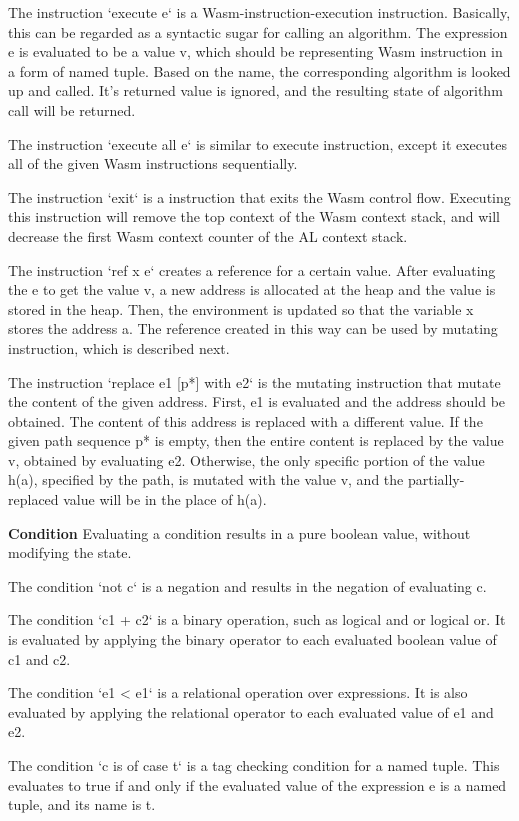 The instruction `execute e` is a Wasm-instruction-execution instruction. Basically, this can be
regarded as a syntactic sugar for calling an algorithm. The expression e is evaluated to be
a value v, which should be representing Wasm instruction in a form of named tuple.
Based on the name, the corresponding algorithm is looked up and called. It's returned value is
ignored, and the resulting state of algorithm call will be returned.

The instruction `execute all e` is similar to execute instruction,
except it executes all of the given Wasm instructions sequentially.

The instruction `exit` is a instruction that exits the Wasm control flow.
Executing this instruction will remove the top context of the Wasm context stack,
and will decrease the first Wasm context counter of the AL context stack.

The instruction `ref x e` creates a reference for a certain value.
After evaluating the e to get the value v, a new address is allocated at the heap and
the value is stored in the heap. Then, the environment is updated so that the
variable x stores the address a. The reference created in this way can be
used by mutating instruction, which is described next.

The instruction `replace e1 [p*] with e2` is the mutating instruction that
mutate the content of the given address. First, e1 is evaluated and the
address should be obtained. The content of this address is replaced with
a different value. If the given path sequence p* is empty, then the entire content
is replaced by the value v, obtained by evaluating e2. Otherwise, the only
specific portion of the value h(a), specified by the path, is mutated with the
value v, and the partially-replaced value will be in the place of h(a).

\textbf{Condition}
Evaluating a condition results in a pure boolean value, without modifying the state.

The condition `not c` is a negation and results in the negation of evaluating c.

The condition `c1 + c2` is a binary operation, such as logical and or logical or. It is evaluated
by applying the binary operator to each evaluated boolean value of c1 and c2.

The condition `e1 < e1` is a relational operation over expressions. It is also evaluated
by applying the relational operator to each evaluated value of e1 and e2.

The condition `c is of case t` is a tag checking condition for a named tuple. This evaluates to
true if and only if the evaluated value of the expression e is a named tuple, and its name is t.

